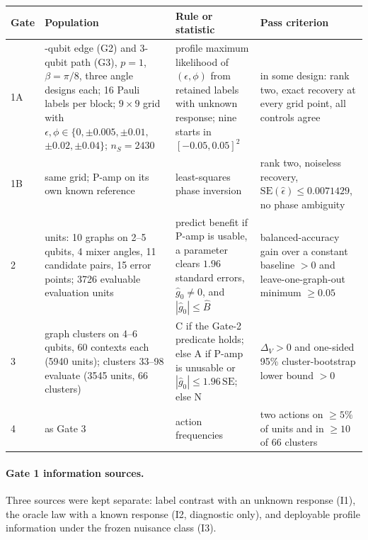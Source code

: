 \documentclass[10pt,twocolumn]{article}
\theoremstyle{definition}
\theoremstyle{remark}
\newcommand{\eps}{\epsilon}
\newcommand{\DV}{\Delta_V}
\begin{document}
\begin{widetable}[t]
\centering\small
\caption{Design of the four gates. All populations are shot-noise-only simulations of the compiled-angle model.}\label{tab:design}
\renewcommand{\arraystretch}{1.25}
\begin{tabularx}{\textwidth}{@{}l>{\raggedright\arraybackslash}X>{\raggedright\arraybackslash}X>{\raggedright\arraybackslash}X@{}}
\toprule
Gate & Population & Rule or statistic & Pass criterion \\
\midrule
1A & 2-qubit edge (G2) and 3-qubit path (G3), $p=1$, $\beta=\pi/8$, three angle designs each; 16 Pauli labels per block; $9\times9$ grid with $\eps,\phi\in\{0,\pm0.005,\pm0.01,$ $\pm0.02,\pm0.04\}$; $n_S=2430$ & profile maximum likelihood of $(\eps,\phi)$ from retained labels with unknown response; nine starts in $[-0.05,0.05]^2$ & in some design: rank two, exact recovery at every grid point, all controls agree \\
1B & same grid; P-amp on its own known reference & least-squares phase inversion & rank two, noiseless recovery, $\mathrm{SE}(\hat\eps)\le0.0071429$, no phase ambiguity \\
2 & 6600 units: 10 graphs on 2--5 qubits, 4 mixer angles, 11 candidate pairs, 15 error points; 3726 evaluable evaluation units & predict benefit if P-amp is usable, a parameter clears $1.96$ standard errors, $\hat g_0\neq0$, and $|\hat g_0|\le\hat B$ & balanced-accuracy gain over a constant baseline $>0$ and leave-one-graph-out minimum $\ge0.05$ \\
3 & 99 graph clusters on 4--6 qubits, 60 contexts each (5940 units); clusters 33--98 evaluate (3545 units, 66 clusters) & C if the Gate-2 predicate holds; else A if P-amp is unusable or $|\hat g_0|\le1.96\,\mathrm{SE}$; else N & $\DV>0$ and one-sided 95\% cluster-bootstrap lower bound $>0$ \\
4 & as Gate 3 & action frequencies & two actions on $\ge5\%$ of units and in $\ge10$ of 66 clusters \\
\bottomrule
\end{tabularx}
\end{widetable}

\paragraph{Gate 1 information sources.} Three sources were kept separate: label contrast with an unknown response (I1), the oracle law with a known response (I2, diagnostic only), and deployable profile information under the frozen nuisance class (I3).
\end{document}
